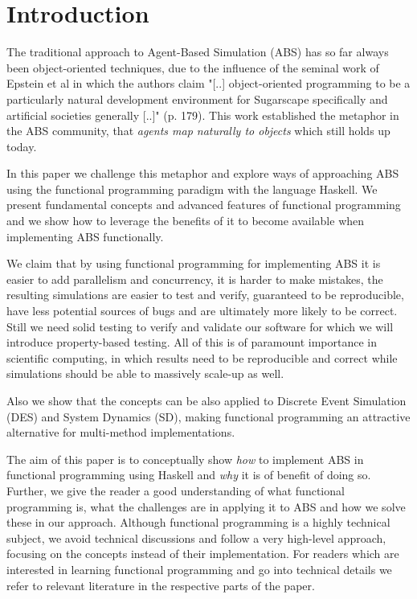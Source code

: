 \section{Introduction}


The traditional approach to Agent-Based Simulation (ABS) has so far always been object-oriented techniques, due to the influence of the seminal work of Epstein et al \cite{epstein_growing_1996} in which the authors claim "[..] object-oriented programming to be a particularly natural development environment for Sugarscape specifically and artificial societies generally [..]" (p. 179). This work established the metaphor in the ABS community, that \textit{agents map naturally to objects} \cite{north_managing_2007} which still holds up today.

In this paper we challenge this metaphor and explore ways of approaching ABS using the functional programming paradigm with the language Haskell. We present fundamental concepts and advanced features of functional programming and we show how to leverage the benefits of it \cite{hudak_history_2007} to become available when implementing ABS functionally.

We claim that by using functional programming for implementing ABS it is easier to add parallelism and concurrency, it is harder to make mistakes, the resulting simulations are easier to test and verify, guaranteed to be reproducible, have less potential sources of bugs and are ultimately more likely to be correct. Still we need solid testing to verify and validate our software for which we will introduce property-based testing. All of this is of paramount importance in scientific computing, in which results need to be reproducible and correct while simulations should be able to massively scale-up as well. 

Also we show that the concepts can be also applied to Discrete Event Simulation (DES) and System Dynamics (SD), making functional programming an attractive alternative for multi-method implementations.

The aim of this paper is to conceptually show \textit{how} to implement ABS in functional programming using Haskell and \textit{why} it is of benefit of doing so. Further, we give the reader a good understanding of what functional programming is, what the challenges are in applying it to ABS and how we solve these in our approach. Although functional programming is a highly technical subject, we avoid technical discussions and follow a very high-level approach, focusing on the concepts instead of their implementation. For readers which are interested in learning functional programming and go into technical details we refer to relevant literature in the respective parts of the paper.

